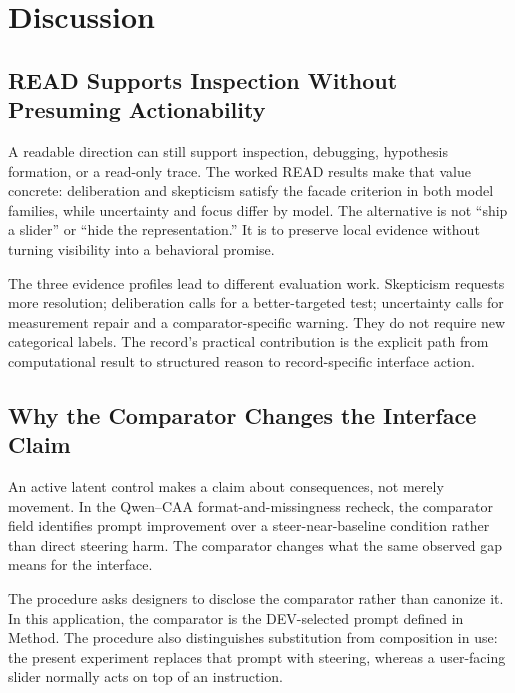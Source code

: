 \documentclass[manuscript,review,anonymous]{acmart}
\begin{document}
\section{Discussion}\label{discussion}

\subsection{READ Supports Inspection Without Presuming Actionability}\label{read-supports-inspection-without-presuming-actionability}

A readable direction can still support inspection, debugging, hypothesis formation, or a read-only trace. The worked READ results make that value concrete: deliberation and skepticism satisfy the facade criterion in both model families, while uncertainty and focus differ by model. {}%
{}%
The alternative is not ``ship a slider'' or ``hide the representation.'' It is to preserve local evidence without turning visibility into a behavioral promise.

The three evidence profiles lead to different evaluation work. Skepticism requests more resolution; deliberation calls for a better-targeted test; uncertainty calls for measurement repair and a comparator-specific warning. {}%
{}%
{}%
They do not require new categorical labels. The record's practical contribution is the explicit path from computational result to structured reason to record-specific interface action.

\subsection{Why the Comparator Changes the Interface Claim}\label{why-the-comparator-changes-the-interface-claim}

An active latent control makes a claim about consequences, not merely movement. In the Qwen--CAA format-and-missingness recheck, the comparator field identifies prompt improvement over a steer-near-baseline condition rather than direct steering harm. {}%
{}%
The comparator changes what the same observed gap means for the interface.

The procedure asks designers to disclose the comparator rather than canonize it. In this application, the comparator is the DEV-selected prompt defined in Method. {}%
{}%
{}%
The procedure also distinguishes substitution from composition in use: the present experiment replaces that prompt with steering, whereas a user-facing slider normally acts on top of an instruction. {}%
\end{document}
